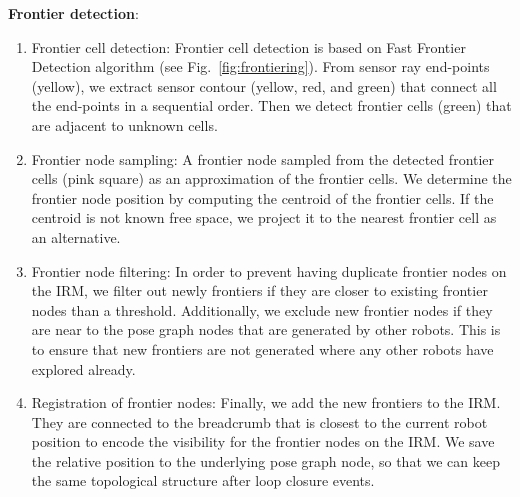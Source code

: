 \documentclass[letterpaper, 10 pt, conference]{ieeeconf}  %
\newcommand{\ph}[1]{{\textbf{#1}:}} %
\begin{document}








\ph{Frontier detection}
\begin{enumerate}
\item Frontier cell detection: 
Frontier cell detection is based on Fast Frontier Detection algorithm \cite{keidar2012robot} (see Fig.~\ref{fig:frontiering}).
From sensor ray end-points (yellow), we extract sensor contour (yellow, red, and green) that connect all the end-points in a sequential order.
Then we detect frontier cells (green) that are adjacent to unknown cells.
\item Frontier node sampling: 
A frontier node sampled from the detected frontier cells (pink square) as an approximation of the frontier cells.
We determine the frontier node position by computing the centroid of the frontier cells.
If the centroid is not known free space, we project it to the nearest frontier cell as an alternative. 
\item Frontier node filtering: 
In order to prevent having duplicate frontier nodes on the IRM, we filter out newly frontiers if they are closer to existing frontier nodes than a threshold.
Additionally, we exclude new frontier nodes if they are near to the pose graph nodes that are generated by other robots.
This is to ensure that new frontiers are not generated where any other robots have explored already.
\item Registration of frontier nodes: 
Finally, we add the new frontiers to the IRM.
They are connected to the breadcrumb that is closest to the current robot position to encode the visibility for the frontier nodes on the IRM.
We save the relative position to the underlying pose graph node, so that we can keep the same topological structure after loop closure events.
\end{enumerate}
\end{document}
